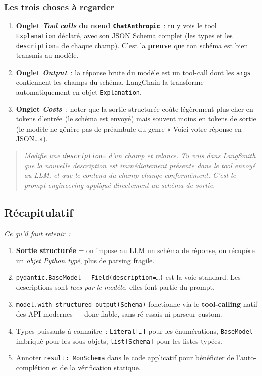 \documentclass[11pt,a4paper]{article}
\begin{document}
\subsubsection*{Les trois choses à regarder}

\begin{enumerate}[leftmargin=*]
  \item \textbf{Onglet \emph{Tool calls} du nœud \texttt{ChatAnthropic}}~:
        tu y vois le tool \texttt{Explanation} déclaré, avec son JSON
        Schema complet (les types et les \texttt{description=} de chaque
        champ). C'est la \textbf{preuve} que ton schéma est bien transmis
        au modèle.
  \item \textbf{Onglet \emph{Output}}~: la réponse brute du modèle est un
        tool-call dont les \texttt{args} contiennent les champs du schéma.
        LangChain la transforme automatiquement en objet \texttt{Explanation}.
  \item \textbf{Onglet \emph{Costs}}~: noter que la sortie structurée coûte
        légèrement plus cher en tokens d'entrée (le schéma est envoyé) mais
        souvent moins en tokens de sortie (le modèle ne génère pas de
        préambule du genre « Voici votre réponse en JSON\dots »).
\end{enumerate}

\begin{quote}\itshape
Modifie une \texttt{description=} d'un champ et relance. Tu vois dans
LangSmith que la nouvelle description est immédiatement présente dans le
tool envoyé au LLM, et que le contenu du champ change conformément. C'est
le \emph{prompt engineering} appliqué directement au schéma de sortie.
\end{quote}

\subsection*{Récapitulatif}
{\itshape\sloppy
\textit{Ce qu'il faut retenir :}
\begin{enumerate}[leftmargin=*]
  \item \textbf{Sortie structurée} = on impose au LLM un schéma de
        réponse, on récupère un \emph{objet Python typé}, plus de parsing
        fragile.
  \item \texttt{pydantic.BaseModel} + \texttt{Field(description=\dots)} est
        la voie standard. Les descriptions sont \emph{lues par le modèle},
        elles font partie du prompt.
  \item \texttt{model.with\_structured\_output(Schema)} fonctionne via le
        \textbf{tool-calling} natif des API modernes — donc fiable, sans
        ré-essais ni parseur custom.
  \item Types puissants à connaître~: \texttt{Literal[\dots]} pour les
        énumérations, \texttt{BaseModel} imbriqué pour les sous-objets,
        \texttt{list[Schema]} pour les listes typées.
  \item Annoter \texttt{result: MonSchema} dans le code applicatif pour
        bénéficier de l'auto-complétion et de la vérification statique.
\end{enumerate}
\par}
\end{document}
